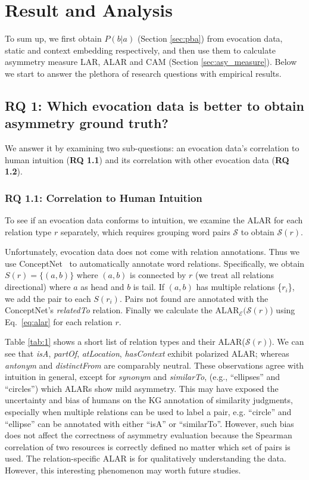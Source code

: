 \documentclass[letterpaper]{article} %
\begin{document}
\section{Result and Analysis}
\label{sec:exp}
To sum up, we first obtain $P(b|a)$ (Section \ref{sec:pba}) from evocation data, static and context embedding respectively, and then use them to calculate asymmetry measure LAR, ALAR and CAM (Section \ref{sec:asy_measure}). Below we start to answer the plethora of research questions with empirical results.

\subsection{\textbf{RQ 1}: Which evocation data is better to obtain asymmetry ground truth?}
We answer it by examining two sub-questions: an evocation data's correlation to human intuition (\textbf{RQ 1.1}) and its correlation with other evocation data (\textbf{RQ 1.2}).

\subsubsection{RQ 1.1: Correlation to Human Intuition}
To see if an evocation data conforms to intuition, we examine the ALAR for each relation type $r$ separately, which requires grouping word pairs $\mathcal{S}$ to obtain $\mathcal{S}(r)$.

Unfortunately, evocation data does not come with relation annotations. Thus we use ConceptNet~\citep{speer2017conceptnet} to automatically annotate word relations. Specifically, we obtain $S(r)=\{(a,b)\}$ where $(a,b)$ is connected by $r$ (we treat all relations directional) where $a$ as head and $b$ is tail. If $(a,b)$ has multiple relations \{$r_i$\}, we add the pair to each $S(r_i)$. Pairs not found are annotated with the ConceptNet's \textit{relatedTo} relation.
Finally we calculate the ALAR$_\mathcal{E}(\mathcal{S}(r)$) using Eq.~\ref{eq:alar}
for each relation $r$.



Table \ref{tab:1} shows a short list of relation types and their ALAR($\mathcal{S}(r)$). We can see that \textit{isA}, \textit{partOf}, \textit{atLocation}, \textit{hasContext} exhibit polarized ALAR; whereas \textit{antonym} and \textit{distinctFrom} are comparably neutral. These observations agree with intuition in general, except for \textit{synonym} and \textit{similarTo}, (e.g., ``ellipses'' and ``circles'') which ALARs show mild asymmetry. This may have exposed the uncertainty and bias of humans on the KG annotation of similarity judgments, especially when
multiple relations can be used to label a pair, e.g. ``circle'' and ``ellipse'' can be annotated with either ``isA'' or ``similarTo''. However, such bias does not affect the correctness of asymmetry evaluation because the Spearman correlation of two resources is correctly defined no matter which set of pairs is used.
The relation-specific ALAR is for qualitatively understanding the data. However, this interesting phenomenon may worth future studies.
\end{document}
